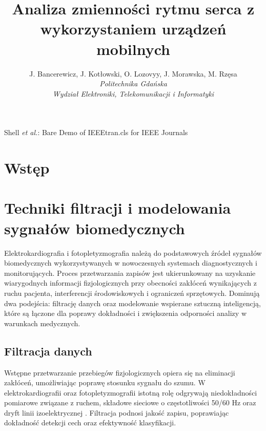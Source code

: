 \documentclass[journal]{IEEEtran}
\begin{document}
\title{Analiza zmienności rytmu serca z wykorzystaniem urządzeń mobilnych}
\author{
    J. Bancerewicz, J. Kotłowski, O. Lozovyy, J. Morawska, M. Rzęsa\\
    \textit{Politechnika Gdańska}\\
    \textit{Wydział Elektroniki, Telekomunikacji i Informatyki}
}


\markboth{}%
{Shell \MakeLowercase{\textit{et al.}}: Bare Demo of IEEEtran.cls for IEEE Journals}
\maketitle




\section{Wstęp}


\newpage
\section{Techniki filtracji i modelowania sygnałów biomedycznych}
Elektrokardiografia i fotopletyzmografia należą do podstawowych źródeł sygnałów biomedycznych wykorzystywanych w nowoczesnych systemach diagnostycznych i monitorujących. Proces przetwarzania zapisów jest ukierunkowany na uzyskanie wiarygodnych informacji fizjologicznych przy obecności zakłóceń wynikających z ruchu pacjenta, interferencji środowiskowych i ograniczeń sprzętowych. Dominują dwa podejścia: filtrację danych oraz modelowanie wspierane sztuczną inteligencją, które są łączone  dla poprawy dokładności i zwiększenia odporności analizy w warunkach medycznych.

\subsection{Filtracja danych}
Wstępne przetwarzanie przebiegów fizjologicznych opiera się na eliminacji zakłóceń, umożliwiając poprawę stosunku sygnału do szumu. W elektrokardiografii oraz fotopletyzmografii istotną rolę odgrywają niedokładności pomiarowe związane z ruchem, składowe sieciowe o częstotliwości 50/60 Hz oraz dryft linii izoelektrycznej \cite{1}. Filtracja podnosi jakość zapisu, poprawiając dokładność detekcji cech oraz efektywność klasyfikacji.
\end{document}
